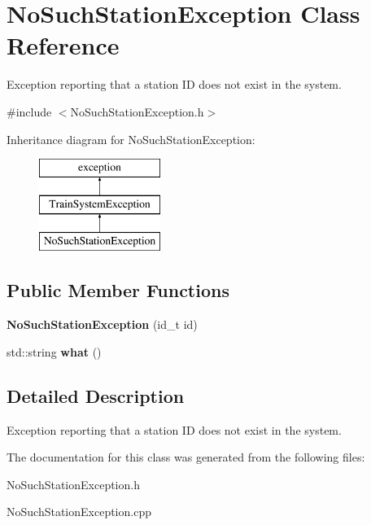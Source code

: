 \hypertarget{classNoSuchStationException}{}\section{No\+Such\+Station\+Exception Class Reference}
\label{classNoSuchStationException}


Exception reporting that a station ID does not exist in the system.  




{\ttfamily \#include $<$No\+Such\+Station\+Exception.\+h$>$}

Inheritance diagram for No\+Such\+Station\+Exception\+:\begin{figure}[H]
\begin{center}
\leavevmode
\includegraphics[height=3.000000cm]{classNoSuchStationException}
\end{center}
\end{figure}
\subsection*{Public Member Functions}
\begin{DoxyCompactItemize}
\item 
\mbox{\label{classNoSuchStationException_a3e907e61f0836f6954f40bd63538bcb6}} 
{\bfseries No\+Such\+Station\+Exception} (id\+\_\+t id)
\item 
\mbox{\label{classNoSuchStationException_aef7808e1393d0ed22d130fa05d20d8f7}} 
std\+::string {\bfseries what} ()
\end{DoxyCompactItemize}


\subsection{Detailed Description}
Exception reporting that a station ID does not exist in the system. 

The documentation for this class was generated from the following files\+:\begin{DoxyCompactItemize}
\item 
No\+Such\+Station\+Exception.\+h\item 
No\+Such\+Station\+Exception.\+cpp\end{DoxyCompactItemize}
